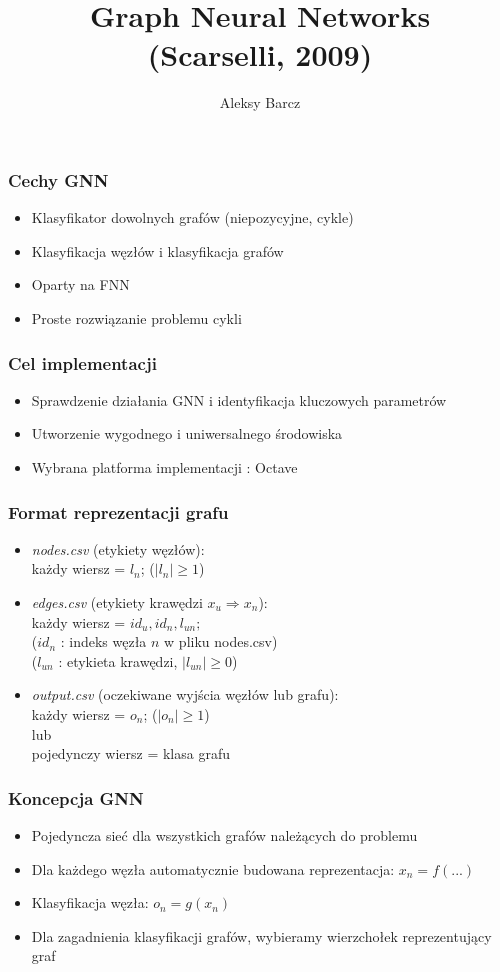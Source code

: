 \documentclass{beamer}
\author{Aleksy Barcz}
\title{Graph Neural Networks\\(Scarselli, 2009)}
\begin{document}
\frame{\titlepage}

\begin{frame}
\frametitle{Cechy GNN}
\begin{itemize}
	\item Klasyfikator dowolnych grafów (niepozycyjne, cykle)
	\item Klasyfikacja węzłów i klasyfikacja grafów
	\item Oparty na FNN
	\item Proste rozwiązanie problemu cykli
\end{itemize}
\end{frame}

\begin{frame}
\frametitle{Cel implementacji}
\begin{itemize}
	\item Sprawdzenie działania GNN i identyfikacja kluczowych parametrów
	\item Utworzenie wygodnego i uniwersalnego środowiska
	\item Wybrana platforma implementacji : Octave
\end{itemize}
\end{frame}

\begin{frame}
\frametitle{Format reprezentacji grafu}
\begin{itemize}
	\item \emph{nodes.csv} (etykiety węzłów):\\każdy wiersz = $l_n$; ($|l_n| \geq 1$)
	\item \emph{edges.csv} (etykiety krawędzi $x_u \Rightarrow x_n$):\\każdy wiersz = $id_u, id_n, l_{un};$
	\\($id_n$ : indeks węzła $n$ w pliku nodes.csv)\\($l_{un}$ : etykieta krawędzi, $|l_{un}| \geq 0$)
	\item \emph{output.csv} (oczekiwane wyjścia węzłów lub grafu):\\każdy wiersz = $o_n$; ($|o_n| \geq 1$)\\lub\\pojedynczy wiersz = klasa grafu
\end{itemize}
\end{frame}

\begin{frame}
\frametitle{Koncepcja GNN}
\begin{itemize}
	\item Pojedyncza sieć dla wszystkich grafów należących do problemu
	\item Dla każdego węzła automatycznie budowana reprezentacja: $x_n = f(...)$
	\item Klasyfikacja węzła: $o_n = g(x_n)$
	\item Dla zagadnienia klasyfikacji grafów, wybieramy wierzchołek reprezentujący graf
\end{itemize}
\end{frame}
\end{document}

